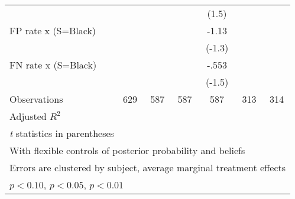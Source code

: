 \begin{table}[htbp]
\begin{tabular}{l*{6}{c}}
                &                  &                  &                  &    (1.5)         &                  &                  \\
FP rate x (S=Black)&                  &                  &                  &    -1.13         &                  &                  \\
                &                  &                  &                  &   (-1.3)         &                  &                  \\
FN rate x (S=Black)&                  &                  &                  &    -.553         &                  &                  \\
                &                  &                  &                  &   (-1.5)         &                  &                  \\
\hline
Observations    &      629         &      587         &      587         &      587         &      313         &      314         \\
Adjusted \(R^{2}\)&                  &                  &                  &                  &                  &                  \\
\hline\hline
\multicolumn{7}{l}{\footnotesize \textit{t} statistics in parentheses}\\
\multicolumn{7}{l}{\footnotesize With flexible controls of posterior probability and beliefs}\\
\multicolumn{7}{l}{\footnotesize Errors are clustered by subject, average marginal treatment effects}\\
\multicolumn{7}{l}{\footnotesize \sym{*} \(p<0.10\), \sym{**} \(p<0.05\), \sym{***} \(p<0.01\)}\\
\end{tabular}
\end{table}
